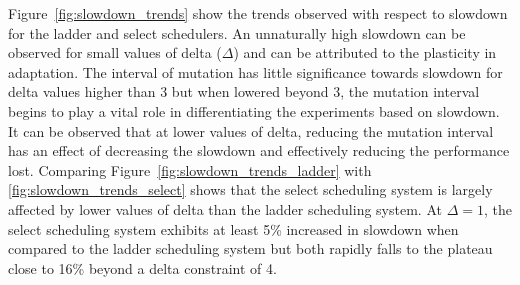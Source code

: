 Figure~\ref{fig:slowdown_trends} show the trends
observed with respect to slowdown for the ladder and select schedulers. An unnaturally 
high slowdown can be observed for small values of delta ($\Delta$) and can be attributed
to the plasticity in adaptation. The interval of mutation has little significance towards slowdown
for delta values higher than 3 but when lowered beyond 3, the mutation interval begins to play a vital 
role in differentiating the experiments based on slowdown. It can be observed that at lower values
of delta, reducing the mutation interval has an effect of decreasing the slowdown and effectively 
reducing the performance lost. Comparing Figure~\ref{fig:slowdown_trends_ladder} 
with \ref{fig:slowdown_trends_select} shows that the select scheduling system is largely affected
by lower values of delta than the ladder scheduling system. At $\Delta = 1$, the select scheduling
system exhibits at least 5\% increased in slowdown when compared to the ladder scheduling system but 
both rapidly falls to the plateau close to 16\% beyond a delta constraint of 4. 

